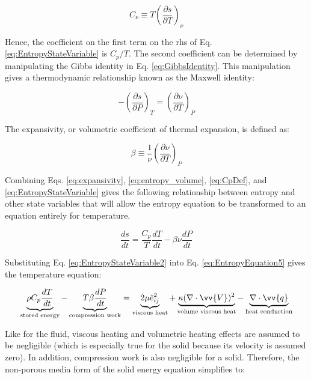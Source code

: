 \documentclass[10pt]{article}
\numberwithin{equation}{section} %
\begin{document}
\begin{equation}
\label{eq:CvDef}
C_\nu\equiv T\left(\frac{\partial s}{\partial T}\right)_\nu
\end{equation}

Hence, the coefficient on the first term on the \gls{rhs} of Eq. \eqref{eq:EntropyStateVariable} is \(C_p/T\). The second coefficient can be determined by manipulating the Gibbs identity in Eq. \eqref{eq:GibbsIdentity}. This manipulation gives a thermodynamic relationship known as the Maxwell identity:

\begin{equation}
\label{eq:entropy_volume}
-\left(\frac{\partial s}{\partial P}\right)_T=\left(\frac{\partial \nu}{\partial T}\right)_P
\end{equation}

The expansivity, or volumetric coefficient of thermal expansion, is defined as:

\begin{equation}
\label{eq:expansivity}
\beta\equiv\frac{1}{\nu}\left(\frac{\partial \nu}{\partial T}\right)_P
\end{equation}

Combining Eqs. \eqref{eq:expansivity}, \eqref{eq:entropy_volume}, \eqref{eq:CpDef}, and \eqref{eq:EntropyStateVariable} gives the following relationship between entropy and other state variables that will allow the entropy equation to be transformed to an equation entirely for temperature.

\begin{equation}
\label{eq:EntropyStateVariable2}
\frac{ds}{dt}=\frac{C_p}{T}\frac{dT}{dt}-\beta \nu\frac{dP}{dt}
\end{equation}

Substituting Eq. \eqref{eq:EntropyStateVariable2} into Eq. \eqref{eq:EntropyEquation5} gives the temperature equation:

\begin{equation}
\label{eq:TemperatureEquation}
\begin{aligned}
\underbrace{\rho C_p\frac{dT}{dt}}_\text{stored energy}-\underbrace{T\beta\frac{dP}{dt}}_\text{compression work}=\underbrace{2\mu \tilde{e}_{ij}^2}_\text{viscous heat}+\underbrace{\kappa(\nabla\cdot\vv{V})^2}_\text{volume viscous heat}-\underbrace{\nabla\cdot\vv{q}}_\text{heat conduction}\\
\end{aligned}
\end{equation}

Like for the fluid, viscous heating and volumetric heating effects are assumed to be negligible (which is especially true for the solid because its velocity is assumed zero). In addition, compression work is also negligible for a solid. Therefore, the non-porous media form of the solid energy equation simplifies to:
\end{document}
